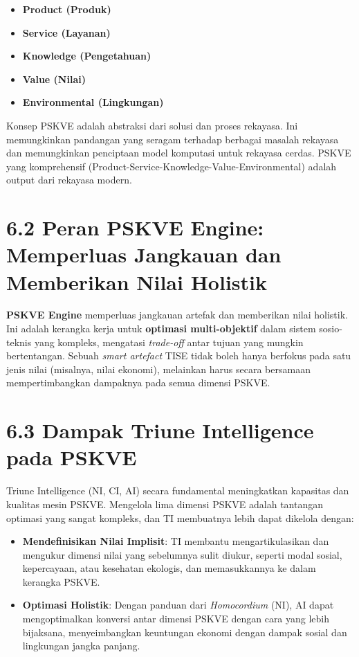 \documentclass[
  letterpaper,
  DIV=11,
  numbers=noendperiod]{scrreprt}
\providecommand{\tightlist}{%
  \setlength{\itemsep}{0pt}\setlength{\parskip}{0pt}}
\begin{document}
\begin{itemize}
\tightlist
\item
  \textbf{Product (Produk)}
\item
  \textbf{Service (Layanan)}
\item
  \textbf{Knowledge (Pengetahuan)}
\item
  \textbf{Value (Nilai)}
\item
  \textbf{Environmental (Lingkungan)}
\end{itemize}

Konsep PSKVE adalah abstraksi dari solusi dan proses rekayasa. Ini
memungkinkan pandangan yang seragam terhadap berbagai masalah rekayasa
dan memungkinkan penciptaan model komputasi untuk rekayasa cerdas. PSKVE
yang komprehensif (Product-Service-Knowledge-Value-Environmental) adalah
output dari rekayasa modern.

\section{\texorpdfstring{\textbf{6.2 Peran PSKVE Engine: Memperluas
Jangkauan dan Memberikan Nilai
Holistik}}{6.2 Peran PSKVE Engine: Memperluas Jangkauan dan Memberikan Nilai Holistik}}\label{peran-pskve-engine-memperluas-jangkauan-dan-memberikan-nilai-holistik}

\textbf{PSKVE Engine} memperluas jangkauan artefak dan memberikan nilai
holistik. Ini adalah kerangka kerja untuk \textbf{optimasi
multi-objektif} dalam sistem sosio-teknis yang kompleks, mengatasi
\emph{trade-off} antar tujuan yang mungkin bertentangan. Sebuah
\emph{smart artefact} TISE tidak boleh hanya berfokus pada satu jenis
nilai (misalnya, nilai ekonomi), melainkan harus secara bersamaan
mempertimbangkan dampaknya pada semua dimensi PSKVE.

\section{\texorpdfstring{\textbf{6.3 Dampak Triune Intelligence pada
PSKVE}}{6.3 Dampak Triune Intelligence pada PSKVE}}\label{dampak-triune-intelligence-pada-pskve}

Triune Intelligence (NI, CI, AI) secara fundamental meningkatkan
kapasitas dan kualitas mesin PSKVE. Mengelola lima dimensi PSKVE adalah
tantangan optimasi yang sangat kompleks, dan TI membuatnya lebih dapat
dikelola dengan:

\begin{itemize}
\tightlist
\item
  \textbf{Mendefinisikan Nilai Implisit}: TI membantu mengartikulasikan
  dan mengukur dimensi nilai yang sebelumnya sulit diukur, seperti modal
  sosial, kepercayaan, atau kesehatan ekologis, dan memasukkannya ke
  dalam kerangka PSKVE.
\item
  \textbf{Optimasi Holistik}: Dengan panduan dari \emph{Homocordium}
  (NI), AI dapat mengoptimalkan konversi antar dimensi PSKVE dengan cara
  yang lebih bijaksana, menyeimbangkan keuntungan ekonomi dengan dampak
  sosial dan lingkungan jangka panjang.
\end{itemize}
\end{document}
